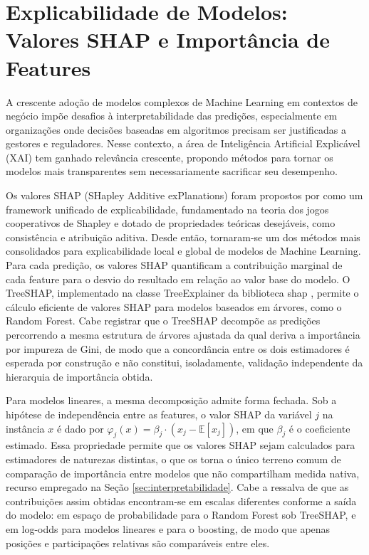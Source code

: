 \FloatBarrier
\section{Explicabilidade de Modelos: Valores SHAP e Importância de Features} \label{sec:shap-teorico}

A crescente adoção de modelos complexos de Machine Learning em contextos de negócio impõe desafios à interpretabilidade das predições, especialmente em organizações onde decisões baseadas em algoritmos precisam ser justificadas a gestores e reguladores. Nesse contexto, a área de Inteligência Artificial Explicável (XAI) tem ganhado relevância crescente, propondo métodos para tornar os modelos mais transparentes sem necessariamente sacrificar seu desempenho.

Os valores SHAP (SHapley Additive exPlanations) foram propostos por  como um framework unificado de explicabilidade, fundamentado na teoria dos jogos cooperativos de Shapley \cite{shapley1953} e dotado de propriedades teóricas desejáveis, como consistência e atribuição aditiva. Desde então, tornaram-se um dos métodos mais consolidados para explicabilidade local e global de modelos de Machine Learning. Para cada predição, os valores SHAP quantificam a contribuição marginal de cada feature para o desvio do resultado em relação ao valor base do modelo. O TreeSHAP, implementado na classe TreeExplainer da biblioteca shap \cite{lundberg2020}, permite o cálculo eficiente de valores SHAP para modelos baseados em árvores, como o Random Forest. Cabe registrar que o TreeSHAP decompõe as predições percorrendo a mesma estrutura de árvores ajustada da qual deriva a importância por impureza de Gini, de modo que a concordância entre os dois estimadores é esperada por construção e não constitui, isoladamente, validação independente da hierarquia de importância obtida.

Para modelos lineares, a mesma decomposição admite forma fechada. Sob a hipótese de independência entre as features, o valor SHAP da variável $j$ na instância $x$ é dado por $\varphi_j(x) = \beta_j \cdot (x_j - \mathbb{E}[x_j])$, em que $\beta_j$ é o coeficiente estimado. Essa propriedade permite que os valores SHAP sejam calculados para estimadores de naturezas distintas, o que os torna o único terreno comum de comparação de importância entre modelos que não compartilham medida nativa, recurso empregado na Seção \ref{sec:interpretabilidade}. Cabe a ressalva de que as contribuições assim obtidas encontram-se em escalas diferentes conforme a saída do modelo: em espaço de probabilidade para o Random Forest sob TreeSHAP, e em log-odds para modelos lineares e para o boosting, de modo que apenas posições e participações relativas são comparáveis entre eles.

